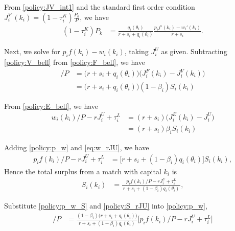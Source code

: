 \documentclass[12pt]{article} %
\theoremstyle{definition}
\begin{document}
From \eqref{policy:JV_int1} and  the standard first order condition  $J_i^{V'}(k_i)=(1-\tau^K_i)\frac{P_k}{P}$, we have
\begin{align}
   (1-\tau^K_i)     P_k &= \frac{q_i(\theta_i)}{r+s_i+q_i(\theta_i)} \frac{p_i f'(k_i) - w_i'(k_i)}{r+s_i}.  \label{policy:P_k_w}
\end{align}

Next, we solve for $p_i f(k_i)-w_i(k_i)$, taking $J_i^U$ as given.
Subtracting \eqref{policy:V_bell} from \eqref{policy:F_bell}, we have
\begin{align}
    [p_i f(k_i)-w_i(k_i)]/P &= \big(r+s_i+q_i(\theta_i)\big)\big(J_i^F(k_i)-J_i^V(k_i)\big)  \nonumber \\
     & = \big(r+s_i+q_i(\theta_i)\big)(1-\beta_i)S_i(k_i)  \label{policy:p_w}
\end{align}

From  \eqref{policy:E_bell}, we have
\begin{align}
    w_i(k_i)/P- rJ_i^U +\tau_i^L &= (r+s_i)\big(J_i^E(k_i)-J_i^U\big)  \nonumber \\
    & = (r+s_i)\beta_i S_i(k_i) \label{eq:w_rJU}
\end{align}

Adding \eqref{policy:p_w}  and \eqref{eq:w_rJU}, we have
\begin{align}
    p_i f(k_i)/P - rJ_i^U +\tau^L_i &= \big[r+s_i+(1-\beta_i)q_i(\theta_i)\big]S_i(k_i),  \label{policy:p_w_S}
    \end{align}
Hence the total surplus from a match with capital $k_i$ is 
\begin{align}
    S_i(k_i) & =\frac{ p_i f(k_i)/P-rJ_i^U + \tau_i^L}{\,r+s_i+(1-\beta_i)q_i(\theta_i)\,}, \label{policy:S_rJU}
    \end{align}

Substitute \eqref{policy:p_w_S} and \eqref{policy:S_rJU} into \eqref{policy:p_w},
\begin{align}
   [ p_i f(k_i)-w_i(k_i) ]/P
    & = \frac{(1-\beta_i)\big(r+s_i+q_i(\theta_i)\big)}{\,r+s_i+(1-\beta_i)q_i(\theta_i)\,}\big[p_i f(k_i)/P-rJ_i^U +\tau^L_i\big] 
\end{align}
\end{document}
